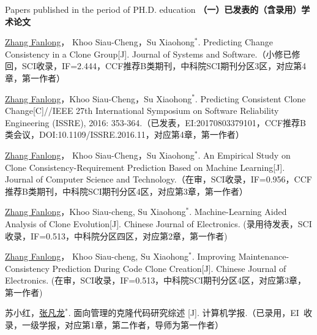 
 {Papers
published in the period of PH.D. education}
\noindent\textbf{（一）已发表的（含录用）学术论文}
\begin{publist}

\item
\underline{Zhang Fanlong}， Khoo Siau-Cheng，Su Xiaohong{$^*$}. Predicting Change Consistency in a Clone Group[J]. Journal of Systems and Software.（小修已修回，SCI收录，IF=2.444，CCF推荐B类期刊，中科院SCI期刊分区3区，对应第4章，第一作者）

\item
\underline{Zhang Fanlong}，Khoo Siau-Cheng，Su Xiaohong{$^*$}. Predicting Consistent Clone Change[C]//IEEE 27th International Symposium on Software Reliability Engineering (ISSRE), 2016: 353-364.（已发表，EI:20170803379101，CCF推荐B类会议，DOI:10.1109/ISSRE.2016.11，对应第4章，第一作者）


\item
\underline{Zhang Fanlong}， Khoo Siau-Cheng，Su Xiaohong{$^*$}. An Empirical Study on Clone Consistency-Requirement Prediction Based on Machine Learning[J]. Journal of Computer Science and Technology.（在审，SCI收录，IF=0.956，CCF推荐B类期刊，中科院SCI期刊分区4区，对应第3章，第一作者）

\item
\underline{Zhang Fanlong}，Khoo Siau-cheng, Su Xiaohong{$^*$}. Machine-Learning Aided Analysis of Clone Evolution[J]. Chinese Journal of Electronics. (录用待发表，SCI收录，IF=0.513，中科院分区四区，对应第2章，第一作者)

\item
\underline{Zhang Fanlong}， Khoo Siau-cheng, Su Xiaohong{$^*$}. Improving Maintenance-Consistency Prediction During Code Clone Creation[J]. Chinese Journal of Electronics. (在审，SCI收录，IF=0.513，中科院SCI期刊分区4区，对应第3章，第一作者)

\item 
苏小红，\underline{张凡龙}{$^*$}. 面向管理的克隆代码研究综述 [J]. 计算机学报.（已录用，EI~收录，一级学报，对应第1章，第二作者，导师为第一作者）


\end{publist}
